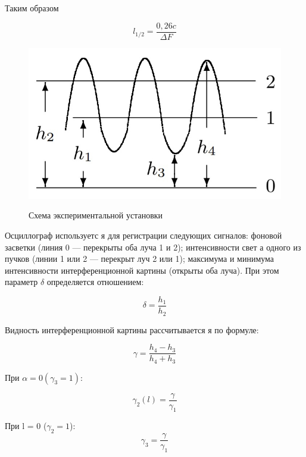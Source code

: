\documentclass[a4paper,12pt]{article}
\begin{document}
Таким образом

\begin{equation} 
\label{eq:halfWidth}
l_{1/2} = \frac{0,26c}{\Delta F}
\end{equation}

\begin{figure}[h]
	\begin{center}
	\includegraphics[scale=0.3]{fig1}
	\label{fig:setup}
	\caption{Схема экспериментальной установки}
	\end{center}
\end{figure}

Осциллограф используетс
я для регистрации следующих сигналов: фоновой засветки (линия 0 — перекрыты оба луча 1 и 2); интенсивности свет а одного из пучков (линии 1 или 2
— перекрыт луч 2 или 1); максимума
и минимума интенсивности интерференционной
картины (открыты оба луча). При этом параметр $\delta$ определяется отношением:

\begin{equation} 
\label{eq:delta}
\delta = \frac{h_1}{h_2}
\end{equation}

Видность интерференционной
картины рассчитывается
я по формуле:

\begin{equation}
\label{eq:gamma}
\gamma = \frac{h_4 - h_3}{h_4 + h_3}
\end{equation}

При $\alpha = 0 (\gamma_3 = 1)$:

\begin{equation}
\label{eq:gamma_2}
\gamma_2(l) = \frac{\gamma}{\gamma_1}
\end{equation}

При l = 0 ($\gamma_2 = 1$):
\begin{equation}
\label{eq:gamma_3}
\gamma_3 = \frac{\gamma}{\gamma_1}
\end{equation}
\end{document}
